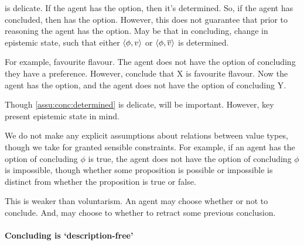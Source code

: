 \begin{note}
   is delicate.
  If the agent has the option, then it's determined.
  So, if the agent has concluded, then has the option.
  However, this does not guarantee that prior to reasoning the agent has the option.
  May be that in concluding, change in epistemic state, such that either \(\langle \phi, v \rangle\) or \(\langle \phi, \overline{v} \rangle\) is determined.

  For example, favourite flavour.
  The agent does not have the option of concluding they have a preference.
  However, conclude that X is favourite flavour.
  Now the agent has the option, and the agent does not have the option of concluding Y.
\end{note}

\begin{note}
  Though \autoref{assu:conc:determined} is delicate, will be important.
  However, key present epistemic state in mind.
\end{note}

\begin{note}
  We do not make any explicit assumptions about relations between value types, though we take for granted sensible constraints.
  For example, if an agent has the option of concluding \(\phi\) is true, the agent does not have the option of concluding \(\phi\) is impossible, though whether some proposition is possible or impossible is distinct from whether the proposition is true or false.
\end{note}

\begin{note}
  This is weaker than voluntarism.
  An agent may choose whether or not to conclude.
  And, may choose to whether to retract some previous conclusion.
\end{note}

\paragraph*{Concluding is `description-free'}

